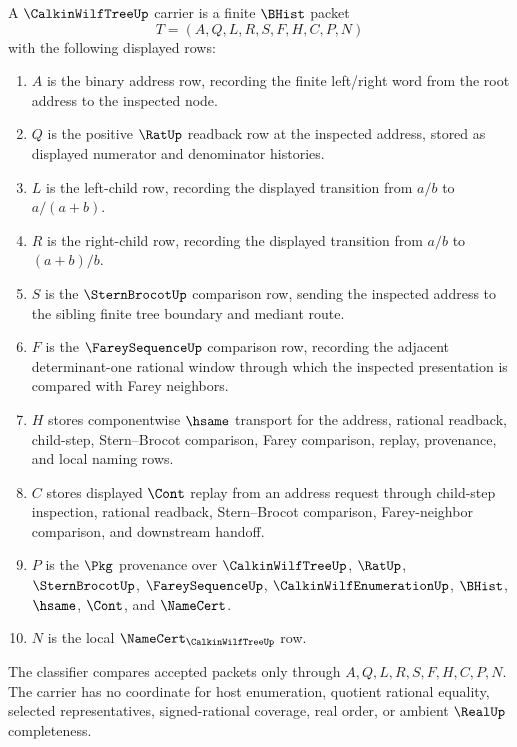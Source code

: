 \begin{definition}
\label{def:calkin-wilf-tree-carrier}
A $\CalkinWilfTreeUp$ carrier is a finite $\BHist$ packet
$$
T=(A,Q,L,R,S,F,H,C,P,N)
$$
with the following displayed rows:
\begin{enumerate}
\item $A$ is the binary address row, recording the finite left/right word from the root address to the inspected node.
\item $Q$ is the positive $\RatUp$ readback row at the inspected address, stored as displayed numerator and denominator histories.
\item $L$ is the left-child row, recording the displayed transition from $a/b$ to $a/(a+b)$.
\item $R$ is the right-child row, recording the displayed transition from $a/b$ to $(a+b)/b$.
\item $S$ is the $\SternBrocotUp$ comparison row, sending the inspected address to the sibling finite tree boundary and mediant route.
\item $F$ is the $\FareySequenceUp$ comparison row, recording the adjacent determinant-one rational window through which the inspected presentation is compared with Farey neighbors.
\item $H$ stores componentwise $\hsame$ transport for the address, rational readback, child-step, Stern--Brocot comparison, Farey comparison, replay, provenance, and local naming rows.
\item $C$ stores displayed $\Cont$ replay from an address request through child-step inspection, rational readback, Stern--Brocot comparison, Farey-neighbor comparison, and downstream handoff.
\item $P$ is the $\Pkg$ provenance over $\CalkinWilfTreeUp$, $\RatUp$, $\SternBrocotUp$, $\FareySequenceUp$, $\CalkinWilfEnumerationUp$, $\BHist$, $\hsame$, $\Cont$, and $\NameCert$.
\item $N$ is the local $\NameCert_{\CalkinWilfTreeUp}$ row.
\end{enumerate}
The classifier compares accepted packets only through $A,Q,L,R,S,F,H,C,P,N$. The carrier has no coordinate for host enumeration, quotient rational equality, selected representatives, signed-rational coverage, real order, or ambient $\RealUp$ completeness.
\end{definition}

